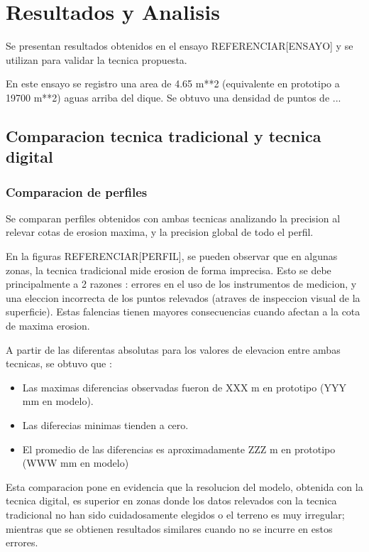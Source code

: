 \chapter{Resultados y Analisis}

Se presentan resultados obtenidos en el ensayo REFERENCIAR[ENSAYO] y se utilizan para validar la tecnica propuesta.

En este ensayo se registro una area de 4.65 m**2 (equivalente en prototipo a 19700 m**2) aguas arriba del dique. Se obtuvo una densidad de puntos de ... 

\section{Comparacion tecnica tradicional y tecnica digital}

\subsection{Comparacion de perfiles}
Se comparan perfiles obtenidos con ambas tecnicas analizando la precision al relevar cotas de erosion maxima, y la precision global de todo el perfil.

En la figuras REFERENCIAR[PERFIL], se pueden observar que en algunas zonas, la tecnica tradicional mide erosion de forma imprecisa. Esto se debe principalmente a 2 razones : errores en el uso de los instrumentos de medicion, y una eleccion incorrecta de los puntos relevados (atraves de inspeccion visual de la superficie). Estas falencias tienen mayores consecuencias cuando afectan a la cota de maxima erosion.

A partir de las diferentas absolutas para los valores de elevacion entre ambas tecnicas, se obtuvo que : 
\begin{itemize}

\item Las maximas diferencias observadas fueron de XXX m en prototipo (YYY mm en modelo). 

\item Las diferecias minimas tienden a cero.

\item El promedio de las diferencias es aproximadamente ZZZ m en prototipo (WWW mm en modelo) \\

\end{itemize}

Esta comparacion pone en evidencia que la resolucion del modelo, obtenida con la tecnica digital, es superior en zonas donde los datos relevados con la tecnica tradicional no han sido cuidadosamente elegidos o el terreno es muy irregular; mientras que se obtienen resultados similares cuando no se incurre en estos errores.

